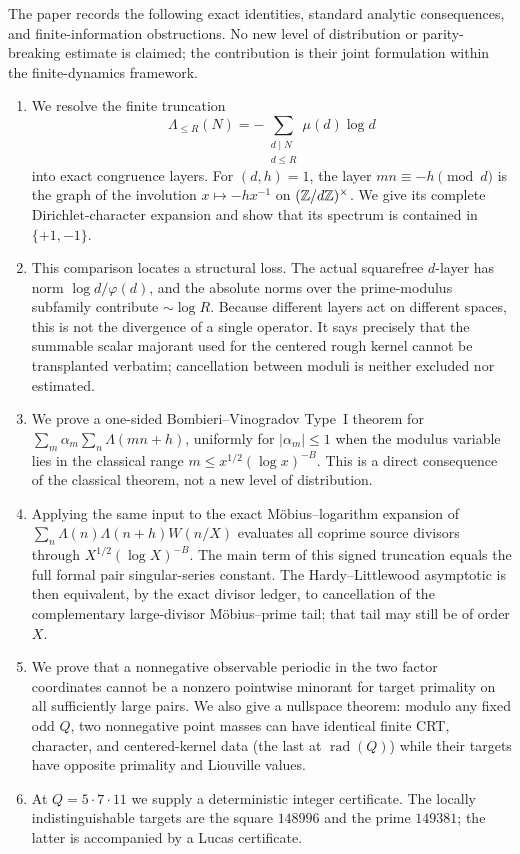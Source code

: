 The paper records the following exact identities, standard analytic
consequences, and finite-information obstructions.  No new level of
distribution or parity-breaking estimate is claimed; the contribution is
their joint formulation within the finite-dynamics framework.
\begin{enumerate}[label=\textbf{R\arabic*.},leftmargin=3.2em]
 \item We resolve the finite truncation
 \[
  \Lambda_{\le R}(N)
  =-\sum_{\substack{d\mid N\\d\le R}}\mu(d)\log d
 \]
 into exact congruence layers.  For $(d,h)=1$, the layer
 $mn\equiv-h\pmod d$ is the graph of the involution
 $x\mapsto-hx^{-1}$ on $(\mathbb Z/d\mathbb Z)^\times$.  We give its complete
 Dirichlet-character expansion and show that its spectrum is contained in
 $\{+1,-1\}$.
 \item This comparison locates a structural loss.  The actual squarefree
 $d$-layer has norm $\log d/\varphi(d)$, and the absolute norms over the
 prime-modulus subfamily contribute $\sim\log R$.  Because different layers
 act on different spaces, this is not the divergence of a single operator.
 It says precisely that the summable scalar majorant used for the centered
 rough kernel cannot be transplanted verbatim; cancellation between moduli
 is neither excluded nor estimated.
 \item We prove a one-sided Bombieri--Vinogradov Type~I theorem for
 $\sum_m\alpha_m\sum_n\Lambda(mn+h)$, uniformly for $|\alpha_m|\le1$
 when the modulus variable lies in the classical range
 $m\le x^{1/2}(\log x)^{-B}$.
 This is a direct consequence of the classical theorem, not a new level of
 distribution.
 \item Applying the same input to the exact M\"obius--logarithm expansion of
 $\sum_n\Lambda(n)\Lambda(n+h)W(n/X)$ evaluates all coprime source divisors
 through $X^{1/2}(\log X)^{-B}$.  The main term of this signed truncation
 equals the full formal pair singular-series constant.  The
 Hardy--Littlewood asymptotic is then equivalent, by the exact divisor
 ledger, to cancellation of the complementary large-divisor
 M\"obius--prime tail; that tail may still be of order $X$.
 \item We prove that a nonnegative observable periodic in the two factor
 coordinates cannot be a nonzero pointwise minorant for target primality on
 all sufficiently large pairs.  We also give a nullspace theorem: modulo any
 fixed odd $Q$, two nonnegative point masses can have identical finite CRT,
 character, and centered-kernel data (the last at $\operatorname{rad}(Q)$)
 while their targets have opposite primality and Liouville values.
 \item At $Q=5\cdot7\cdot11$ we supply a deterministic integer certificate.
 The locally indistinguishable targets are the square $148996$ and the prime
 $149381$; the latter is accompanied by a Lucas certificate.
\end{enumerate}

